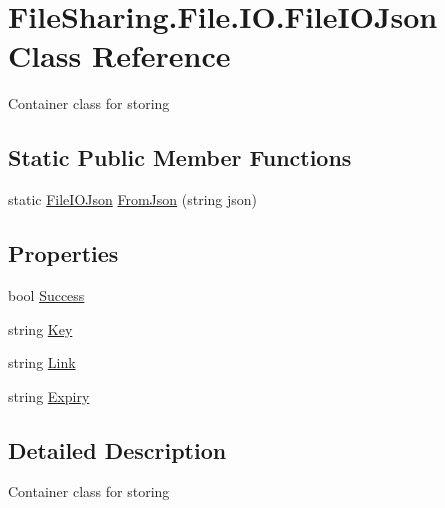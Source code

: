 \hypertarget{class_file_sharing_1_1_file_1_1_i_o_1_1_file_i_o_json}{}\section{File\+Sharing.\+File.\+I\+O.\+File\+I\+O\+Json Class Reference}
\label{class_file_sharing_1_1_file_1_1_i_o_1_1_file_i_o_json}


Container class for storing  


\subsection*{Static Public Member Functions}
\begin{DoxyCompactItemize}
\item 
static \hyperlink{class_file_sharing_1_1_file_1_1_i_o_1_1_file_i_o_json}{File\+I\+O\+Json} \hyperlink{class_file_sharing_1_1_file_1_1_i_o_1_1_file_i_o_json_ad5388e800494f0bad65d91858bd8b246}{From\+Json} (string json)
\end{DoxyCompactItemize}
\subsection*{Properties}
\begin{DoxyCompactItemize}
\item 
bool \hyperlink{class_file_sharing_1_1_file_1_1_i_o_1_1_file_i_o_json_a1f7d3ea73196d599b0fed654380e6195}{Success}
\item 
string \hyperlink{class_file_sharing_1_1_file_1_1_i_o_1_1_file_i_o_json_aa1a7c3f5510cde16016e1207ffcad67b}{Key}
\item 
string \hyperlink{class_file_sharing_1_1_file_1_1_i_o_1_1_file_i_o_json_a8374b013799f1abfc26b35d88f4575ab}{Link}
\item 
string \hyperlink{class_file_sharing_1_1_file_1_1_i_o_1_1_file_i_o_json_a94249575a71d3b7c6692e291c508fe1e}{Expiry}
\end{DoxyCompactItemize}


\subsection{Detailed Description}
Container class for storing 



